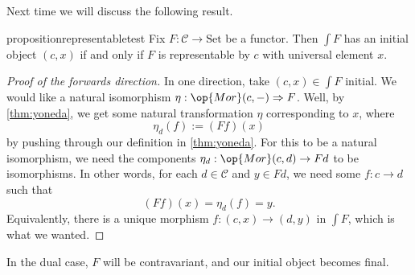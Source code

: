 \documentclass[../notes.tex]{subfiles}
\begin{document}
Next time we will discuss the following result.
\begin{restatable}{proposition}{representabletest} \label{prop:representabletest}
	Fix $F:\mathcal C\to\mathrm{Set}$ be a functor. Then $\int F$ has an initial object $(c,x)$ if and only if $F$ is representable by $c$ with universal element $x$.
\end{restatable}
\begin{proof}[Proof of the forwards direction]
	In one direction, take $(c,x)\in\int F$ initial. We would like a natural isomorphism $\eta:\op{Mor}(c,-)\Rightarrow F$. Well, by \autoref{thm:yoneda}, we get some natural transformation $\eta$ corresponding to $x$, where
	\[\eta_d(f):=(Ff)(x)\]
	by pushing through our definition in \autoref{thm:yoneda}. For this to be a natural isomorphism, we need the components $\eta_d:\op{Mor}(c,d)\to Fd$ to be isomorphisms. In other words, for each $d\in\mathcal C$ and $y\in Fd$, we need some $f:c\to d$ such that
	\[(Ff)(x)=\eta_d(f)=y.\]
	Equivalently, there is a unique morphism $f:(c,x)\to(d,y)$ in $\int F$, which is what we wanted.
\end{proof}
\begin{remark}
	In the dual case, $F$ will be contravariant, and our initial object becomes final.
\end{remark}
\end{document}
